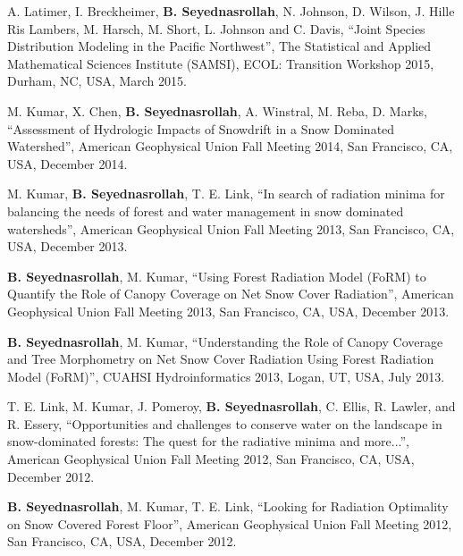 \documentclass[10pt]{article}
\newenvironment{changemargin}[2]{%
  \begin{list}{}{%
 \setlength{\topsep}{0pt}%
 \setlength{\leftmargin}{#1}%
 \setlength{\rightmargin}{#2}%
 \setlength{\listparindent}{\parindent}%
 \setlength{\itemindent}{\parindent}%
 \setlength{\parsep}{\parskip}%
  }%
  \item[]}{\end{list}
}
\newenvironment{body} {
  \vspace*{-2pt}
  \begin{changemargin}{-0.5in}{-0.5in}
}
{\end{changemargin}
}
\begin{document}
\begin{body}
\begin{etaremune}
\item A. Latimer, I. Breckheimer, \textbf{B. Seyednasrollah}, N. Johnson, D. Wilson, J. Hille Ris Lambers, M. Harsch, M. Short, L. Johnson and C. Davis, ``Joint Species Distribution Modeling in the Pacific Northwest'', The Statistical and Applied Mathematical Sciences Institute (SAMSI), ECOL: Transition Workshop 2015, Durham, NC, USA, March 2015.\\
    \medskip


    \item M. Kumar, X. Chen, \textbf{B. Seyednasrollah}, A. Winstral, M. Reba, D. Marks, ``Assessment of Hydrologic Impacts of Snowdrift in a Snow Dominated Watershed'', American Geophysical Union Fall Meeting 2014, San Francisco, CA, USA, December 2014.\\
    \medskip

    \item M. Kumar, \textbf{B. Seyednasrollah}, T. E. Link, ``In search of radiation minima for balancing the needs of forest and water management in snow dominated watersheds'', American Geophysical Union Fall Meeting 2013, San Francisco, CA, USA, December 2013.\\
    \medskip

    \item \textbf{B. Seyednasrollah}, M. Kumar, ``Using Forest Radiation Model (FoRM) to Quantify the Role of Canopy Coverage on Net Snow Cover Radiation'', American Geophysical Union Fall Meeting 2013, San Francisco, CA, USA, December 2013.\\
    \medskip

    \item \textbf{B. Seyednasrollah}, M. Kumar, ``Understanding the Role of Canopy Coverage and Tree Morphometry on Net Snow Cover Radiation Using Forest Radiation Model (FoRM)'', CUAHSI Hydroinformatics 2013, Logan, UT, USA, July 2013.\\
    \medskip

    \item T. E. Link, M. Kumar, J. Pomeroy, \textbf{B. Seyednasrollah}, C. Ellis, R. Lawler, and R. Essery, ``Opportunities and challenges to conserve water on the landscape in snow-dominated forests: The quest for the radiative minima and more...'', American Geophysical Union Fall Meeting 2012, San Francisco, CA, USA, December 2012.\\
    \medskip

    \item \textbf{B. Seyednasrollah}, M. Kumar, T. E. Link, ``Looking for Radiation Optimality on Snow Covered Forest Floor'', American Geophysical Union Fall Meeting 2012, San Francisco, CA, USA, December 2012.\\
    \medskip


\end{etaremune}
\end{body}
\end{document}
